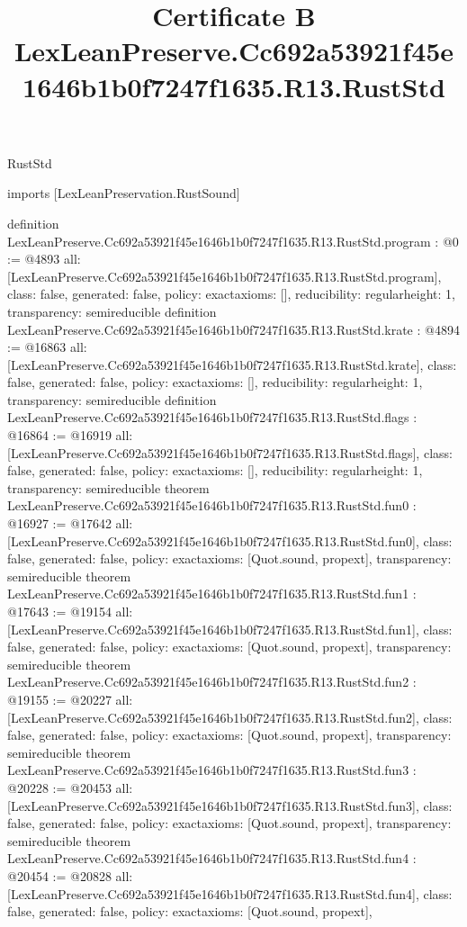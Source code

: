 \begin{lexlean}{RustStd}
\title{Certificate B LexLeanPreserve.Cc692a53921f45e1646b1b0f7247f1635.R13.RustStd}
\begin{coremodule}
imports [LexLeanPreservation.RustSound]

definition LexLeanPreserve.Cc692a53921f45e1646b1b0f7247f1635.R13.RustStd.program : @0 := @4893 {
  all: [LexLeanPreserve.Cc692a53921f45e1646b1b0f7247f1635.R13.RustStd.program],
  class: false,
  generated: false,
  policy: exact{axioms: []},
  reducibility: regular{height: 1},
  transparency: semireducible
}
definition LexLeanPreserve.Cc692a53921f45e1646b1b0f7247f1635.R13.RustStd.krate : @4894 := @16863 {
  all: [LexLeanPreserve.Cc692a53921f45e1646b1b0f7247f1635.R13.RustStd.krate],
  class: false,
  generated: false,
  policy: exact{axioms: []},
  reducibility: regular{height: 1},
  transparency: semireducible
}
definition LexLeanPreserve.Cc692a53921f45e1646b1b0f7247f1635.R13.RustStd.flags : @16864 := @16919 {
  all: [LexLeanPreserve.Cc692a53921f45e1646b1b0f7247f1635.R13.RustStd.flags],
  class: false,
  generated: false,
  policy: exact{axioms: []},
  reducibility: regular{height: 1},
  transparency: semireducible
}
theorem LexLeanPreserve.Cc692a53921f45e1646b1b0f7247f1635.R13.RustStd.fun0 : @16927 := @17642 {
  all: [LexLeanPreserve.Cc692a53921f45e1646b1b0f7247f1635.R13.RustStd.fun0],
  class: false,
  generated: false,
  policy: exact{axioms: [Quot.sound, propext]},
  transparency: semireducible
}
theorem LexLeanPreserve.Cc692a53921f45e1646b1b0f7247f1635.R13.RustStd.fun1 : @17643 := @19154 {
  all: [LexLeanPreserve.Cc692a53921f45e1646b1b0f7247f1635.R13.RustStd.fun1],
  class: false,
  generated: false,
  policy: exact{axioms: [Quot.sound, propext]},
  transparency: semireducible
}
theorem LexLeanPreserve.Cc692a53921f45e1646b1b0f7247f1635.R13.RustStd.fun2 : @19155 := @20227 {
  all: [LexLeanPreserve.Cc692a53921f45e1646b1b0f7247f1635.R13.RustStd.fun2],
  class: false,
  generated: false,
  policy: exact{axioms: [Quot.sound, propext]},
  transparency: semireducible
}
theorem LexLeanPreserve.Cc692a53921f45e1646b1b0f7247f1635.R13.RustStd.fun3 : @20228 := @20453 {
  all: [LexLeanPreserve.Cc692a53921f45e1646b1b0f7247f1635.R13.RustStd.fun3],
  class: false,
  generated: false,
  policy: exact{axioms: [Quot.sound, propext]},
  transparency: semireducible
}
theorem LexLeanPreserve.Cc692a53921f45e1646b1b0f7247f1635.R13.RustStd.fun4 : @20454 := @20828 {
  all: [LexLeanPreserve.Cc692a53921f45e1646b1b0f7247f1635.R13.RustStd.fun4],
  class: false,
  generated: false,
  policy: exact{axioms: [Quot.sound, propext]},
}
\end{coremodule}
\end{lexlean}

